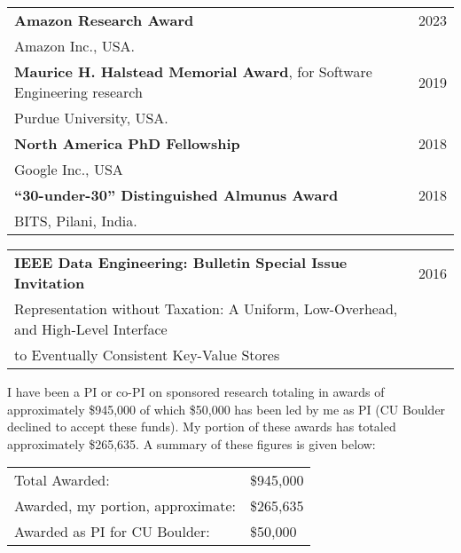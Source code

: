 \documentclass{article}
\begin{document}
\vspace{-0.8em}
\begin{center}
  \begin{tabular}{ p{15cm}  r }
{\bf Amazon Research Award} & 2023 \\ [3pt]
\hspace{2em} Amazon Inc., USA. &
\\[6pt]
%
{\bf Maurice H. Halstead Memorial Award}, for Software
Engineering research & 2019 \\ [3pt]
\hspace{2em} Purdue University, USA. &
\\[6pt]
%
{\bf North America PhD Fellowship}& 2018 \\ [3pt]
\hspace{2em} Google Inc., USA &
\\[6pt]
%
{\bf ``30-under-30'' Distinguished Almunus Award} & 2018\\ [3pt]
    \hspace{2em} BITS, Pilani, India. & \\[6pt]
   \end{tabular}
\end{center}

\begin{center}
  \begin{tabular}{ p{15cm}  r }
    {\bf IEEE Data Engineering: Bulletin Special Issue Invitation} & 2016\\ [3pt]
    \hspace{2em} Representation without Taxation: A Uniform, Low-Overhead,
    and High-Level Interface & \\
    \hspace{2em} to Eventually Consistent Key-Value Stores   & \\[6pt]
    \end{tabular}
\end{center}



\vspace{1em}
\noindent I have been a PI or co-PI on sponsored research totaling in
awards of approximately \$945,000 of which \$50,000 has been led by me as
PI (CU Boulder declined to accept these funds). My portion of these awards
has totaled approximately \$265,635. A summary of these figures is given
below:

\vspace{1em}
\begin{tabular}{p{8cm}  l}
  Total Awarded: &  \$945,000\\
  Awarded, my portion, approximate:& \$265,635 \\
  Awarded as PI for CU Boulder:& \$50,000  
\end{tabular}
\end{document}

